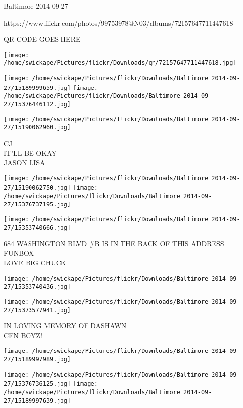 \documentclass[10pt,letterpaper]{article}
\begin{document}
Baltimore 2014-09-27

https://www.flickr.com/photos/99753978@N03/albums/72157647711447618

QR CODE GOES HERE

\texttt{[image: /home/swickape/Pictures/flickr/Downloads/qr/72157647711447618.jpg]}
\pagebreak

\texttt{[image: /home/swickape/Pictures/flickr/Downloads/Baltimore 2014-09-27/15189999659.jpg]}
\texttt{[image: /home/swickape/Pictures/flickr/Downloads/Baltimore 2014-09-27/15376446112.jpg]}

\vspace{0.25in}
\texttt{[image: /home/swickape/Pictures/flickr/Downloads/Baltimore 2014-09-27/15190062960.jpg]}

CJ\\
IT'LL BE OKAY\\
JASON LISA\\
\pagebreak

\texttt{[image: /home/swickape/Pictures/flickr/Downloads/Baltimore 2014-09-27/15190062750.jpg]}
\texttt{[image: /home/swickape/Pictures/flickr/Downloads/Baltimore 2014-09-27/15376737195.jpg]}

\vspace{0.25in}
\texttt{[image: /home/swickape/Pictures/flickr/Downloads/Baltimore 2014-09-27/15353740666.jpg]}

684 WASHINGTON BLVD \#B IS IN THE BACK OF THIS ADDRESS\\
FUNBOX\\
LOVE BIG CHUCK\\
\pagebreak

\texttt{[image: /home/swickape/Pictures/flickr/Downloads/Baltimore 2014-09-27/15353740436.jpg]}

\vspace{0.25in}
\texttt{[image: /home/swickape/Pictures/flickr/Downloads/Baltimore 2014-09-27/15373577941.jpg]}

IN LOVING MEMORY OF DASHAWN\\
CFN BOYZ!\\
\pagebreak

\texttt{[image: /home/swickape/Pictures/flickr/Downloads/Baltimore 2014-09-27/15189997989.jpg]}

\vspace{0.25in}
\texttt{[image: /home/swickape/Pictures/flickr/Downloads/Baltimore 2014-09-27/15376736125.jpg]}
\texttt{[image: /home/swickape/Pictures/flickr/Downloads/Baltimore 2014-09-27/15189997639.jpg]}
\end{document}
